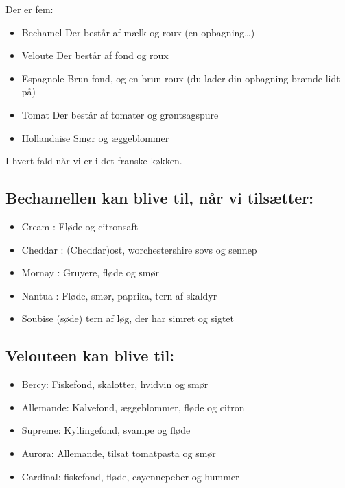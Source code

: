 \documentclass[
  letterpaper,
  DIV=11,
  numbers=noendperiod]{scrreprt}
\providecommand{\tightlist}{%
  \setlength{\itemsep}{0pt}\setlength{\parskip}{0pt}}\usepackage{longtable,booktabs,array}
\begin{document}
Der er fem:

\begin{itemize}
\tightlist
\item
  Bechamel Der består af mælk og roux (en opbagning\ldots)
\item
  Veloute Der består af fond og roux
\item
  Espagnole Brun fond, og en brun roux (du lader din opbagning brænde
  lidt på)
\item
  Tomat Der består af tomater og grøntsagspure
\item
  Hollandaise Smør og æggeblommer
\end{itemize}

I hvert fald når vi er i det franske køkken.

\hypertarget{bechamellen-kan-blive-til-nuxe5r-vi-tilsuxe6tter}{%
\subsection{Bechamellen kan blive til, når vi
tilsætter:}\label{bechamellen-kan-blive-til-nuxe5r-vi-tilsuxe6tter}}

\begin{itemize}
\tightlist
\item
  Cream : Fløde og citronsaft
\item
  Cheddar : (Cheddar)ost, worchestershire sovs og sennep
\item
  Mornay : Gruyere, fløde og smør
\item
  Nantua : Fløde, smør, paprika, tern af skaldyr
\item
  Soubise (søde) tern af løg, der har simret og sigtet
\end{itemize}

\hypertarget{velouteen-kan-blive-til}{%
\subsection{Velouteen kan blive til:}\label{velouteen-kan-blive-til}}

\begin{itemize}
\tightlist
\item
  Bercy: Fiskefond, skalotter, hvidvin og smør
\item
  Allemande: Kalvefond, æggeblommer, fløde og citron
\item
  Supreme: Kyllingefond, svampe og fløde
\item
  Aurora: Allemande, tilsat tomatpasta og smør
\item
  Cardinal: fiskefond, fløde, cayennepeber og hummer
\end{itemize}
\end{document}
